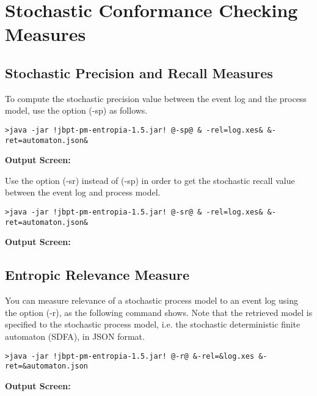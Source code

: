 \section*{Stochastic Conformance Checking Measures}
\setcounter{subsection}{0}
\subsection{Stochastic Precision and Recall Measures}
To compute the stochastic precision value between the event log and the process model, use the option (\textcolor{darkcandyapplered}{\footnotesize\ttfamily-sp}) as follows.
\begin{lstlisting}[style=CL]
>java -jar !jbpt-pm-entropia-1.5.jar! @-sp@ & -rel=log.xes& &-ret=automaton.json&
\end{lstlisting}
\textbf{Output Screen:}%


Use the option (\textcolor{darkcandyapplered}{\footnotesize\ttfamily-sr}) instead of (\textcolor{darkcandyapplered}{\footnotesize\ttfamily-sp}) in order to get the stochastic recall value between the event log and process model. 
\begin{lstlisting}[style=CL]
>java -jar !jbpt-pm-entropia-1.5.jar! @-sr@ & -rel=log.xes& &-ret=automaton.json&
\end{lstlisting}
\textbf{Output Screen:}%

\subsection{Entropic Relevance Measure}
You can measure relevance of a stochastic process model to an event log using the option (\textcolor{darkcandyapplered}{\footnotesize\ttfamily-r}), as the following command shows. Note that the retrieved model is specified to the stochastic process model, i.e. the stochastic deterministic finite automaton (SDFA), in JSON format.

\begin{lstlisting}[style=CL]
>java -jar !jbpt-pm-entropia-1.5.jar! @-r@ &-rel=&log.xes &-ret=&automaton.json
\end{lstlisting}
\textbf{Output Screen:}%
